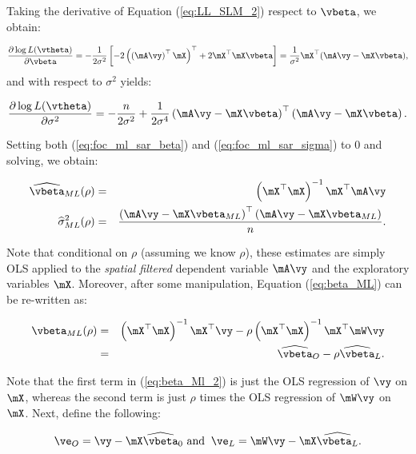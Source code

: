 \documentclass[english,12pt]{book}\usepackage[]{graphicx}\usepackage[]{xcolor}
\begin{document}
Taking the derivative of Equation (\ref{eq:LL_SLM_2}) respect to $\vbeta$, we obtain:

\begin{equation}\label{eq:foc_ml_sar_beta}
\frac{\partial \log L(\vtheta)}{\partial \vbeta} = -\frac{1}{2\sigma^2}\left[-2\left(\left(\mA\vy\right)^\top\mX\right)^\top + 2 \mX^\top\mX\vbeta\right] = \frac{1}{\sigma^2}\mX^\top(\mA\vy - \mX\vbeta),
\end{equation}
%
and with respect to $\sigma^2$ yields:

\begin{equation}\label{eq:foc_ml_sar_sigma}
\frac{\partial \log L(\vtheta)}{\partial \sigma^2} = -\frac{n}{2\sigma^2} + \frac{1}{2\sigma^4}\left(\mA\vy - \mX\vbeta\right)^\top\left(\mA\vy - \mX\vbeta\right).
\end{equation}

Setting both (\ref{eq:foc_ml_sar_beta}) and (\ref{eq:foc_ml_sar_sigma}) to 0 and solving, we obtain:

\begin{eqnarray}
	\widehat{\vbeta}_{ML}(\rho) &=& \left(\mX^\top\mX\right)^{-1}\mX^\top\mA\vy \label{eq:beta_ML} \\
	\widehat{\sigma}^2_{ML}(\rho) &=& \frac{\left(\mA\vy - \mX\vbeta_{ML}\right)^\top\left(\mA\vy - \mX\vbeta_{ML}\right)}{n}\label{eq:sigma_ML}.
\end{eqnarray}

Note that conditional on $\rho$ (assuming we know $\rho$), these estimates are simply OLS applied to the \emph{spatial filtered} dependent variable $\mA\vy$ and the exploratory variables $\mX$. Moreover, after some manipulation, Equation (\ref{eq:beta_ML}) can be re-written as:

\begin{eqnarray}\label{eq:beta_Ml_2}
\vbeta_{ML}(\rho) &=& \left(\mX^\top\mX\right)^{-1}\mX^\top\vy - \rho\left(\mX^\top\mX\right)^{-1}\mX^\top\mW\vy \nonumber \\
&=& \widehat{\vbeta}_O -\rho \widehat{\vbeta}_L\label{eq:beta_ml_exp}.
\end{eqnarray}

Note that the first term in  (\ref{eq:beta_Ml_2}) is just the OLS regression of $\vy$ on $\mX$, whereas the second term is just $\rho$ times the OLS regression of $\mW\vy$ on $\mX$. Next, define the following:

\begin{equation}\label{eq:SLM_aux_residuals}
\ve_O = \vy - \mX\widehat{\vbeta}_0\,\,\mbox{and} \;\; \ve_L = \mW\vy - \mX\widehat{\vbeta_L}.
\end{equation}
\end{document}
